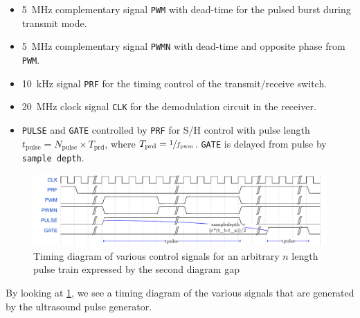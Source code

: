 \begin{itemize}
	\item \qty{5}{\mega\hertz} complementary signal \texttt{PWM} with dead-time for the pulsed burst during transmit mode.
	\item \qty{5}{\mega\hertz} complementary signal \texttt{PWMN} with dead-time and opposite phase from \texttt{PWM}.
	\item \qty{10}{\kilo\hertz} signal \texttt{PRF} for the timing control of the transmit/receive switch.
	\item \qty{20}{\mega\hertz} clock signal \texttt{CLK} for the demodulation circuit in the receiver.
	\item \texttt{PULSE} and \texttt{GATE} controlled by \texttt{PRF} for S/H control with pulse length $t_{\mathrm{pulse}} = N_{\mathrm{pulse}} \times T_{\mathrm{prd}}$, where $T_{\mathrm{prd}} = \sfrac{1}{f_{\mathrm{pwm}}}$. \texttt{GATE} is delayed from pulse by \texttt{sample depth}.
\end{itemize}

\begin{figure}[htbp]
	\centering
	\includegraphics[width=\textwidth]{Figures/3_wavedrom.pdf}
	\caption{Timing diagram of various control signals for an arbitrary $n$ length pulse train expressed by the second diagram gap}
	\label{fig:3_pulse_timing_diagram}
\end{figure}
By looking at \cref{fig:3_pulse_timing_diagram}, we see a timing diagram of the various signals that are generated by the ultrasound pulse generator.


